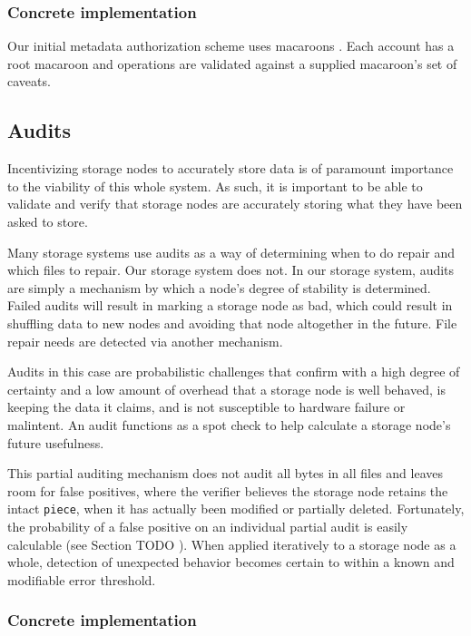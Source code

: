 \documentclass[a4paper,10pt]{article} \usepackage[utf8]{inputenc}
\newcommand{\x}[1]{{\tt #1}} \newcommand{\code}[1]{{\tt #1}}
\newcommand{\todo}[1]{{\color{red} TODO #1 }}
\begin{document}
\subsubsection{Concrete implementation}

Our initial metadata authorization scheme uses macaroons \cite{macaroons}.
Each account has a root macaroon and operations are validated against a supplied
macaroon's set of caveats.

\subsection{Audits}

Incentivizing storage nodes to accurately store data is of paramount importance 
to
the viability of this whole system. As such, it is important to be able to
validate and verify that storage nodes are accurately storing what they have 
been
asked to store.

Many storage systems use audits as a way of determining when to do repair and
which files to repair. Our storage system does not. In our storage system,
audits are simply a mechanism by which a node's degree of stability is
determined. Failed audits will result in marking a storage node as bad, which
could result in shuffling data to new nodes and avoiding that node altogether
in the future. File repair needs are detected via another mechanism.

Audits in this case are probabilistic challenges that confirm with a high
degree of certainty and a low amount of overhead that a storage node is well
behaved, is keeping the data it claims, and is not susceptible to hardware
failure or malintent. An audit functions as a spot check to help calculate a
storage node's future usefulness.

This partial auditing mechanism does not audit all bytes in all files and
leaves room for false positives, where the verifier believes the storage node
retains the intact \x{piece}, when it has actually been modified or partially
deleted. Fortunately, the probability of a false positive on an individual
partial audit is easily calculable (see Section \todo{}). When applied
iteratively to a storage node as a whole, detection of unexpected behavior
becomes certain to within a known and modifiable error threshold.

\subsubsection{Concrete implementation}
\end{document}
